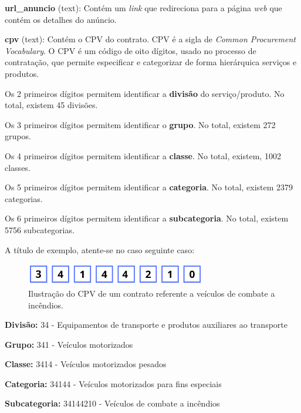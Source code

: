\begin{my_itemize}
\item \textbf{url\_anuncio} (text): Contém um \textit{link} que redireciona para a página \textit{web} que contém os detalhes do anúncio.

\item \textbf{cpv} (text): Contém o CPV do contrato. CPV é a sigla de \textit{Common Procurement Vocabulary}. O CPV é um código de oito dígitos, usado no processo de contratação, que permite especificar e categorizar de forma hierárquica serviços e produtos. 

\begin{my_itemize}
	\item[$\circ$] \label{sec:cepeves}  Os 2 primeiros dígitos permitem identificar a \textbf{divisão} do serviço/produto. No total, existem 45 divisões.
	\item[$\circ$]  Os 3 primeiros dígitos permitem identificar o \textbf{grupo}. No total, existem 272 grupos.
	\item[$\circ$]  Os 4 primeiros dígitos permitem identificar a \textbf{classe}. No total, existem, 1002 classes.
	\item[$\circ$]  Os 5 primeiros dígitos permitem identificar a \textbf{categoria}. No total, existem 2379 categorias.
	\item[$\circ$]  Os 6 primeiros dígitos permitem identificar a \textbf{subcategoria}. No total, existem 5756 subcategorias.
\end{my_itemize}

A título de exemplo, atente-se no caso seguinte caso:

\begin{figure}[H]
	\centering
	\includegraphics[width=0.7\textwidth]{imagens/cpv.png}
	\caption{Ilustração do CPV de um contrato referente a veículos de combate a incêndios.}
	\label{fig:cpv}
\end{figure}


\begin{my_itemize}
	\item[$\circ$]  \textbf{Divisão:} 34 - Equipamentos de transporte e produtos auxiliares ao transporte
	\item[$\circ$]  \textbf{Grupo:} 341 - Veículos motorizados
	\item[$\circ$]  \textbf{Classe:} 3414 - Veículos motorizados pesados
	\item[$\circ$]  \textbf{Categoria:} 34144 - Veículos motorizados para fins especiais
	\item[$\circ$]  \textbf{Subcategoria:} 34144210 - Veículos de combate a incêndios
\end{my_itemize}




\end{my_itemize}
